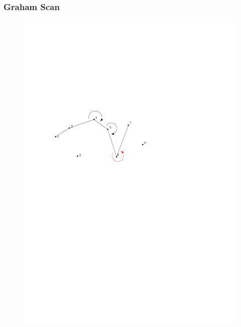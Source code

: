 \begin{frame}
	\frametitle{{Graham Scan}}
\begin{figure}[htbp]
	\begin{center}
  	\includegraphics[width=.8\linewidth]{bilder/graham6}
	\end{center}
\end{figure}
\end{frame}


